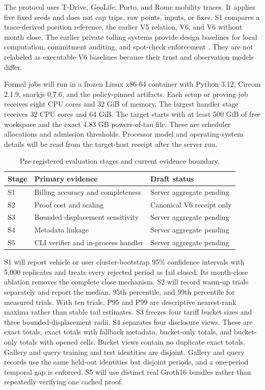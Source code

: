 \documentclass[conference]{IEEEtran}
\theoremstyle{plain}
\theoremstyle{definition}
\begin{document}
The protocol uses T-Drive, GeoLife, Porto, and Rome mobility traces. It applies
five fixed seeds and does not cap trips, raw points, inputs, or fixes. S1
compares a trace-derived position reference, the earlier V5 relation, V6, and V6
without month close. The earlier private tolling systems provide design
baselines for local computation, commitment auditing, and spot-check
enforcement \cite{Popa2009VPriv,Balasch2010PrETP,Meiklejohn2011Milo}. They are
not relabeled as executable V6 baselines because their trust and observation
models differ.

Formal jobs will run in a frozen Linux x86-64 container with Python 3.12, Circom
2.1.9, snarkjs 0.7.6, and the policy-pinned artifacts. Each setup or proving job
receives eight CPU cores and 32 GiB of memory. The largest handler stage
receives 32 CPU cores and 64 GiB. The target starts with at least 500 GiB of
free workspace and the exact 4.83 GB powers-of-tau file. These are scheduler
allocations and admission thresholds. Processor model and operating-system
details will be read from the target-host receipt after the server run.

\begin{table}[t]
\centering
\caption{Pre-registered evaluation stages and current evidence boundary.}
\label{tab:formal-status}
\small
\begin{tabularx}{\columnwidth}{@{}lYY@{}}
\toprule
Stage & Primary evidence & Draft status \\
\midrule
S1 & Billing accuracy and completeness & Server aggregate pending \\
S2 & Proof cost and scaling & Canonical V6 receipt only \\
S3 & Bounded displacement sensitivity & Server aggregate pending \\
S4 & Metadata linkage & Server aggregate pending \\
S5 & CLI verifier and in-process handler & Server aggregate pending \\
\bottomrule
\end{tabularx}
\end{table}

S1 will report vehicle or user cluster-bootstrap 95\% confidence intervals with
5,000 replicates and treats every rejected period as fail closed. Its
month-close ablation removes the complete close mechanism. S2 will record warm-up
trials separately and report the median, 95th percentile, and 99th percentile
for measured trials. With ten trials, P95 and P99 are descriptive nearest-rank
maxima rather than stable tail estimates. S3 freezes four tariff bucket sizes
and three bounded-displacement radii. S4 separates four disclosure views. These are exact totals, exact
totals with fallback metadata, bucket-only totals, and bucket-only totals with
opened cells. Bucket views contain no duplicate exact totals. Gallery and query
training and test identities are disjoint. Gallery and query records use the
same held-out identities but disjoint periods, and a one-period temporal gap is
enforced. S5 will use distinct real Groth16 bundles rather than repeatedly
verifying one cached proof.
\end{document}
